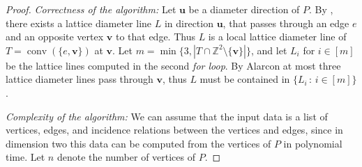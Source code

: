 \documentclass[11pt]{article}
\newcommand{\bu}{\mathbf{u}}
\newcommand{\bv}{\mathbf{v}}
\newcommand{\Z}{\mathbb{Z}}
\DeclareMathOperator{\conv}{conv}
\newcommand{\st}{\, \mathrm{:}\,}
\begin{document}
\begin{proof}
    \emph{Correctness of the algorithm:} Let $\bu$ be a diameter direction of $P$. By , there exists a lattice diameter line $L$ in direction $\bu$, that passes through an edge $e$ and an opposite vertex $\bv$ to that edge. Thus $L$ is a local lattice diameter line of $T=\conv(\{e,\bv\})$ at $\bv$. Let $m = \min \{3, |T \cap \Z^2 \setminus \{\bv\}|\}$, and let $L_i$ for $i \in [m]$ be the lattice lines computed in the second \textit{for loop}. By Alarcon \cite[Lemma~2.4]{Alarcon_PhD} at most three lattice diameter lines pass through $\bv$, thus $L$ must be contained in $\{L_i \st i \in [m]\}$.

    \emph{Complexity of the algorithm:} We can assume that the input data is a list of vertices, edges, and incidence relations between the vertices and edges, since in dimension two this data can be computed from the vertices of $P$ in polynomial time. Let $n$ denote the number of vertices of $P$.


\end{proof}
\end{document}
